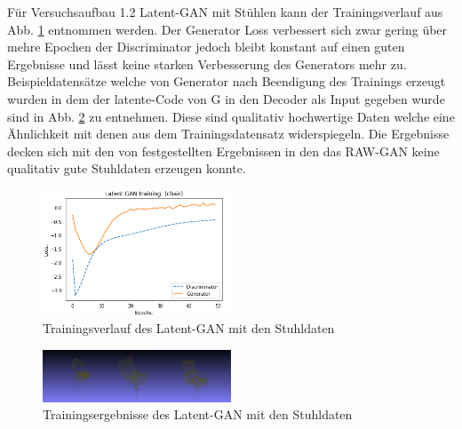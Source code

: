 \documentclass{llncs}
\begin{document}
Für Versuchsaufbau 1.2 Latent-GAN mit Stühlen kann der Trainingsverlauf aus Abb. \ref{fig:Bild61} entnommen werden. Der Generator Loss verbessert sich zwar gering über mehre Epochen der Discriminator jedoch bleibt konstant auf einen guten Ergebnisse und lässt keine starken Verbesserung des Generators mehr zu. Beispieldatensätze welche von Generator nach Beendigung des Trainings erzeugt wurden in dem der latente-Code von G in den Decoder als Input gegeben wurde sind in Abb. \ref{fig:Bild62} zu entnehmen. Diese sind qualitativ hochwertige Daten welche eine Ähnlichkeit mit denen aus dem Trainingsdatensatz widerspiegeln. Die Ergebnisse decken sich mit den von \cite{3dgan} festgestellten Ergebnissen in den das RAW-GAN keine qualitativ gute Stuhldaten erzeugen konnte. 

\begin{figure}[htbp] 
	\centering
	\includegraphics[width=0.5\textwidth]{latent_gan_chair_result.png}
	\caption{Trainingsverlauf des Latent-GAN mit den Stuhldaten}
	\label{fig:Bild61}
\end{figure}

\begin{figure}[htbp] 
	\centering
	\includegraphics[width=0.5\textwidth]{latent_gan_chair_example.png}
	\caption{Trainingsergebnisse des Latent-GAN mit den Stuhldaten}
	\label{fig:Bild62}
\end{figure}
\end{document}
